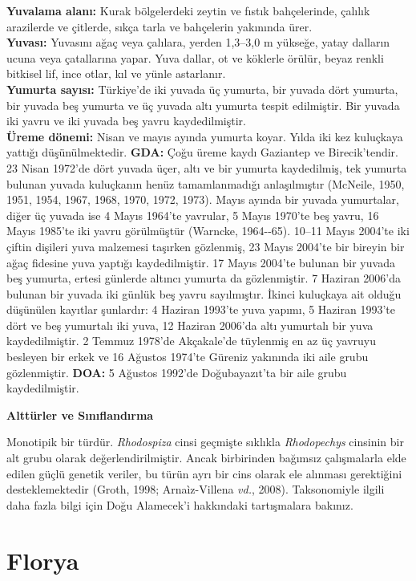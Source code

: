 \documentclass[
  10.5pt,
  a4paper,
  DIV=11,
  numbers=noendperiod,
  twocolumn]{scrreprt}
\begin{document}
\textbf{Yuvalama alanı:} Kurak bölgelerdeki zeytin ve fıstık
bahçelerinde, çalılık arazilerde ve çitlerde, sıkça tarla ve bahçelerin
yakınında ürer.\\
\textbf{Yuvası:} Yuvasını ağaç veya çalılara, yerden 1,3--3,0 m yükseğe,
yatay dalların ucuna veya çatallarına yapar. Yuva dallar, ot ve köklerle
örülür, beyaz renkli bitkisel lif, ince otlar, kıl ve yünle
astarlanır.\\
\textbf{Yumurta sayısı:} Türkiye'de iki yuvada üç yumurta, bir yuvada
dört yumurta, bir yuvada beş yumurta ve üç yuvada altı yumurta tespit
edilmiştir. Bir yuvada iki yavru ve iki yuvada beş yavru
kaydedilmiştir.\\
\textbf{Üreme dönemi:} Nisan ve mayıs ayında yumurta koyar. Yılda iki
kez kuluçkaya yattığı düşünülmektedir. \textbf{GDA:} Çoğu üreme kaydı
Gaziantep ve Birecik'tendir. 23 Nisan 1972'de dört yuvada üçer, altı ve
bir yumurta kaydedilmiş, tek yumurta bulunan yuvada kuluçkanın henüz
tamamlanmadığı anlaşılmıştır (McNeile, 1950, 1951, 1954, 1967, 1968,
1970, 1972, 1973). Mayıs ayında bir yuvada yumurtalar, diğer üç yuvada
ise 4 Mayıs 1964'te yavrular, 5 Mayıs 1970'te beş yavru, 16 Mayıs
1985'te iki yavru görülmüştür (Warncke, 1964-\/-65). 10--11 Mayıs
2004'te iki çiftin dişileri yuva malzemesi taşırken gözlenmiş, 23 Mayıs
2004'te bir bireyin bir ağaç fidesine yuva yaptığı kaydedilmiştir. 17
Mayıs 2004'te bulunan bir yuvada beş yumurta, ertesi günlerde altıncı
yumurta da gözlenmiştir. 7 Haziran 2006'da bulunan bir yuvada iki günlük
beş yavru sayılmıştır. İkinci kuluçkaya ait olduğu düşünülen kayıtlar
şunlardır: 4 Haziran 1993'te yuva yapımı, 5 Haziran 1993'te dört ve beş
yumurtalı iki yuva, 12 Haziran 2006'da altı yumurtalı bir yuva
kaydedilmiştir. 2 Temmuz 1978'de Akçakale'de tüylenmiş en az üç yavruyu
besleyen bir erkek ve 16 Ağustos 1974'te Güreniz yakınında iki aile
grubu gözlenmiştir. \textbf{DOA:} 5 Ağustos 1992'de Doğubayazıt'ta bir
aile grubu kaydedilmiştir.

\textbf{Alttürler ve Sınıflandırma}

Monotipik bir türdür. \emph{Rhodospiza} cinsi geçmişte sıklıkla
\emph{Rhodopechys} cinsinin bir alt grubu olarak değerlendirilmiştir.
Ancak birbirinden bağımsız çalışmalarla elde edilen güçlü genetik
veriler, bu türün ayrı bir cins olarak ele alınması gerektiğini
desteklemektedir (Groth, 1998; Arnaìz-Villena \emph{vd.}, 2008).
Taksonomiyle ilgili daha fazla bilgi için Doğu Alamecek'i hakkındaki
tartışmalara bakınız.

\section{Florya}\label{florya}
\end{document}
